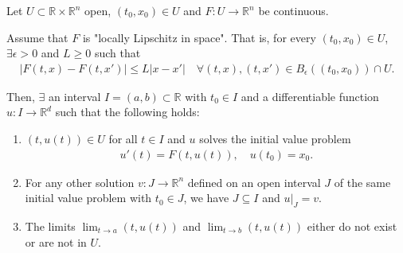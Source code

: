 \begin{theorem}\label{thm:picard}
	Let $U \subset \mathbb{R} \times \mathbb{R}^{n}$ open, $(t_{0}, x_{0}) \in U$ and $F: U \to \mathbb{R}^{n}$ be continuous.

	Assume that $F$ is "locally Lipschitz in space". That is, for every $(t_{0}, x_{0}) \in U$, $\exists \epsilon > 0$ and $L \geq 0$ such that
	\begin{align*}
		\left| F(t,x) - F(t,x') \right| \leq L \left| x-x' \right| \quad \forall (t,x), (t,x') \in B_{\epsilon}((t_{0}, x_{0})) \cap U.
	\end{align*}

	Then, $\exists$ an interval $I = (a,b) \subset \mathbb{R}$ with $t_{0} \in I$ and a differentiable function $u: I \to \mathbb{R}^{d}$ such that the following holds:
	\begin{enumerate}
		\item $(t,u(t)) \in U$ for all $t \in I$ and $u$ solves the initial value problem
		      \begin{align*}
			      u'(t) = F(t,u(t)), \quad u(t_{0}) = x_{0}.
		      \end{align*}
		\item For any other solution $v: J \to \mathbb{R}^{n}$ defined on an open interval $J$ of the same initial value problem with $t_{0} \in J$, we have $J \subseteq I$ and $u|_{J} = v$.
		\item The limits $\lim_{t \to a}(t,u(t))$ and $\lim_{t \to b}(t,u(t))$ either do not exist or are not in $U$.
	\end{enumerate}
\end{theorem}
